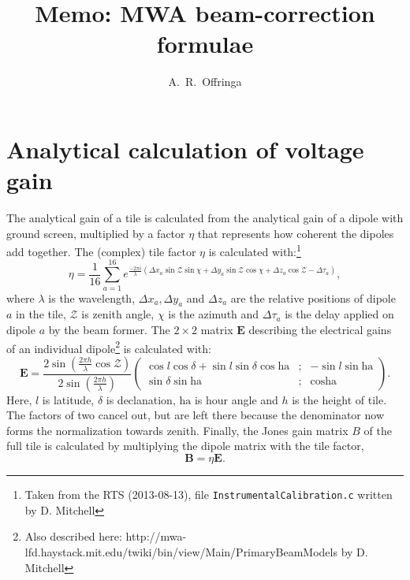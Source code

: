 \documentclass[a4paper,11pt]{article}
\title{Memo: MWA beam-correction formulae}
\author{A.~R.~Offringa}
\begin{document}
\label{firstpage}
\maketitle

\section{Analytical calculation of voltage gain}
The analytical gain of a tile is calculated from the analytical gain of a dipole with ground screen, multiplied by a factor $\eta$ that represents how coherent the dipoles add together. The (complex) tile factor $\eta$ is calculated with:\footnote{Taken from the RTS (2013-08-13), file \texttt{InstrumentalCalibration.c} written by D. Mitchell}
\begin{equation}
 \eta = \frac{1}{16}\sum\limits_{a=1}^{16} e^{\frac{-2 \pi i}{\lambda} \left(\Delta x_a \sin \mathcal{Z} \sin \chi + \Delta y_a \sin \mathcal{Z} \cos \chi + \Delta z_a \cos \mathcal{Z} - \Delta \tau_a \right) },
\end{equation}
where $\lambda$ is the wavelength, $\Delta x_a, \Delta y_a$ and $\Delta z_a$ are the relative positions of dipole $a$ in the tile, $\mathcal{Z}$ is zenith angle, $\chi$ is the azimuth and $\Delta \tau_a$ is the delay applied on dipole $a$ by the beam former. The $2 \times 2$ matrix $\textbf{E}$ describing the electrical gains of an individual dipole\footnote{Also described here: http://mwa-lfd.haystack.mit.edu/twiki/bin/view/Main/PrimaryBeamModels by D. Mitchell} is calculated with:
\begin{equation}
\mathbf{E} = \frac{2 \sin \left( \frac{2 \pi h}{\lambda} \cos \mathcal{Z}\right)}{2 \sin \left( \frac{2 \pi h}{\lambda}\right)}
\left( \begin{array}{ccc}
\cos l \cos \delta + \sin l \sin \delta \cos \textrm{ha} & ; & -\sin l \sin \textrm{ha} \\
\sin \delta \sin \textrm{ha} & ; & \cos \textrm{ha}
\end{array} \right).
\end{equation}
Here, $l$ is latitude, $\delta$ is declanation, $\textrm{ha}$ is hour angle and $h$ is the height of tile. The factors of two cancel out, but are left there because the denominator now forms the normalization towards zenith. Finally, the Jones gain matrix $B$ of the full tile is calculated by multiplying the dipole matrix with the tile factor,
\begin{equation}
\mathbf{B} = \eta \mathbf{E}.
\end{equation}
\end{document}
